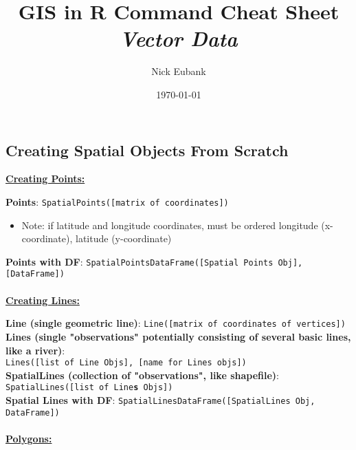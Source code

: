 \documentclass[10pt]{article}
\title{GIS in R Command Cheat Sheet \\ \emph{Vector Data}}
\date{\today}
\author{Nick Eubank}
\begin{document}
 
\maketitle




\hrulefill 
\subsection*{Creating Spatial Objects From Scratch}
\underline{\textbf{Creating Points:}}

\textbf{Points}: \texttt{SpatialPoints([matrix of coordinates])}
\begin{itemize}
	\item Note: if latitude and longitude coordinates, must be ordered longitude (x-coordinate), latitude (y-coordinate)
\end{itemize}
\textbf{Points with DF}: \texttt{SpatialPointsDataFrame([Spatial Points Obj], [DataFrame])}\\
\\
\underline{\textbf{Creating Lines:}}

\textbf{Line (single geometric line)}: \texttt{Line([matrix of coordinates of vertices])}\\
\textbf{Lines (single "observations" potentially consisting of several basic lines, like a river)}:\\ 
\hspace*{1cm} \texttt{Lines([list of Line Objs], [name for Lines objs])}\\
\textbf{SpatialLines (collection of "observations", like shapefile)}: \\
\hspace*{1cm} \texttt{SpatialLines([list of Line\textbf{s} Objs])}\\
\textbf{Spatial Lines with DF}: \texttt{SpatialLinesDataFrame([SpatialLines Obj, DataFrame])}\\
\\
\underline{\textbf{Polygons:}}
\end{document}
